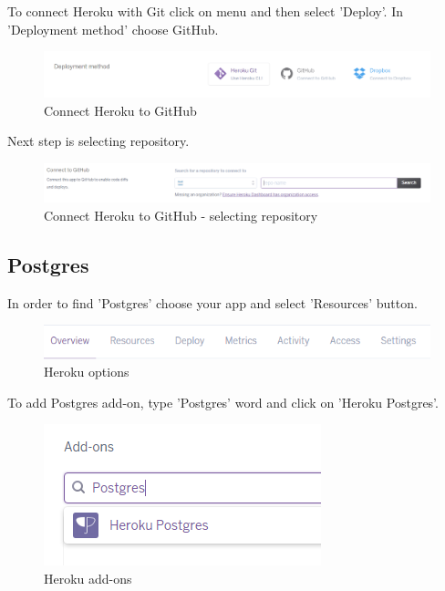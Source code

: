 \documentclass[12pt,a4paper]{article}
\begin{document}
To connect Heroku with Git click on menu and then select 'Deploy'. In 'Deployment method' choose GitHub.
\begin{figure}[H]
	\centering
	\includegraphics[width = 1 \textwidth]{images/git.PNG}
	\caption{Connect Heroku to GitHub}
	\label{fig:git}
\end{figure}

Next step is selecting repository.

\begin{figure}[H]
	\centering
	\includegraphics[width = 1 \textwidth]{images/git2.PNG}
	\caption{Connect Heroku to GitHub - selecting repository}
	\label{fig:git2}
\end{figure}


\subsection{Postgres}

In order to find 'Postgres' choose your app and select 'Resources' button.
\begin{figure}[H]
	\centering
	\includegraphics{images/nav.PNG}
	\caption{Heroku options}
	\label{fig:nav}
\end{figure}


To add Postgres add-on, type 'Postgres' word and click on 'Heroku Postgres'. 
\begin{figure}[H]
	\centering
	\includegraphics{images/addon.PNG}
	\caption{Heroku add-ons}
	\label{fig:addon}
\end{figure}
\end{document}
